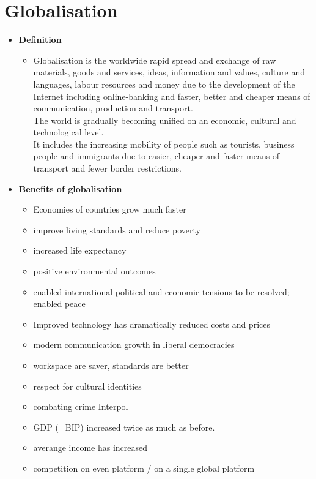 \documentclass[a5paper,12pt,twoside,titlepage]{scrartcl}
\begin{document}
\section{Globalisation}
\begin{itemize}
	\item\textbf{Definition}
	\begin{itemize}
		\item Globalisation is the worldwide rapid spread and exchange of raw materials, goods and services, ideas, information and values, culture and languages, labour resources and money due to the development of the Internet including online-banking and faster, better and cheaper means of communication, production and transport. \\
		The world is gradually becoming unified on an economic, cultural and technological level. \\
		It includes the increasing mobility of people such as tourists, business people and immigrants due to easier, cheaper and faster means of transport and fewer border restrictions.
	\end{itemize}

	\item \textbf{Benefits of globalisation}
	\begin{itemize}
		\item Economies of countries grow much faster
		\item improve living standards and reduce poverty
		\item increased life expectancy
		\item positive environmental outcomes
		\item enabled international political and economic tensions to be resolved; enabled peace
		\item Improved technology has dramatically reduced costs and prices
		\item modern communication growth in liberal democracies
		\item workspace are saver, standards are better
		\item respect for cultural identities
		\item combating crime \textrightarrow Interpol
		\item GDP (=BIP) increased twice as much as before. 
		\item averange income has increased
		\item competition on even platform / on a single global platform
	\end{itemize}


\end{itemize}
\end{document}

